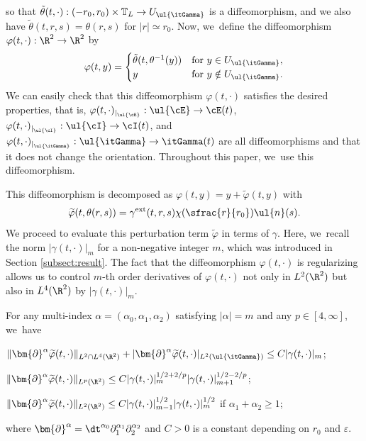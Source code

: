so that $\tilde{\theta}(t,\cdot): (-r_0,r_0)\times\mathbb{T}_L \to U_{\ul{\itGamma}}$ is a diffeomorphism,
and we also have $\tilde{\theta}(t,r,s)=\theta(r,s)$ for $|r|\simeq r_0$.
Now, we~define the diffeomorphism $\varphi(t,\cdot) : \R^2 \to \R^2$ by
\begin{equation}\label{const phi}
\varphi(t,y) =
\begin{cases}
\tilde{\theta}(t,\theta^{-1}(y)) &\text{for } y \in U_{\ul{\itGamma}}, \\
y & \text{for } y \notin U_{\ul{\itGamma}}.
\end{cases}
\end{equation}
We can easily check that this diffeomorphism $\varphi(t,\cdot)$ satisfies the desired properties, that is,
$\varphi(t,\cdot)_{\vert_{\ul{\cE}}} : \ul{\cE}\to \cE(t)$, $\varphi(t,\cdot)_{\vert_{\ul{\cI}}} : \ul{\cI}\to \cI(t)$, and
$\varphi(t,\cdot)_{\vert_{\ul{\itGamma}}} : \ul{\itGamma}\to \itGamma(t)$ are all diffeomorphisms and that it does not change the orientation.
Throughout this paper, we~use this diffeomorphism.

This diffeomorphism is decomposed as $\varphi(t,y)=y+\widetilde{\varphi}(t,y)$ with
\[
\widetilde{\varphi}(t,\theta(r,s))=\gamma^{\rm ext}(t,r,s)\chi(\sfrac{r}{r_0})\ul{n}(s).
\]
We proceed to evaluate this perturbation term $\widetilde{\varphi}$ in terms of $\gamma$.
Here, we~recall the norm $|\gamma(t,\cdot)|_m$ for a non-negative integer $m$, which was introduced in Section \ref{subsect:result}.
The fact that the diffeomorphism $\varphi(t,\cdot)$ is regularizing allows us to control $m$-th order derivatives of $\varphi(t,\cdot)$
not only in $L^2(\R^2)$ but also in $L^4(\R^2)$ by $|\gamma(t,\cdot)|_m$.

\begin{lemma}\label{lem:EstDM}
For any multi-index $\alpha=(\alpha_0,\alpha_1,\alpha_2)$ satisfying $|\alpha|=m$ and any $p\in[4,\infty]$, we~have
\begin{enumeratei}
\item\label{lem:EstDMi}
$\|\bm{\partial}^\alpha\widetilde{\varphi}(t,\cdot)\|_{L^2\cap L^4(\R^2)} + |\bm{\partial}^\alpha\widetilde{\varphi}(t,\cdot)|_{L^2(\ul{\itGamma})}
\leq C|\gamma(t,\cdot)|_m$;
\item\label{lem:EstDMii}
$\|\bm{\partial}^\alpha\widetilde{\varphi}(t,\cdot)\|_{L^p(\R^2)}\leq C|\gamma(t,\cdot)|_m^{1/2+2/p}|\gamma(t,\cdot)|_{m+1}^{1/2-2/p}$;
\item\label{lem:EstDMiii}
$\|\bm{\partial}^\alpha\widetilde{\varphi}(t,\cdot)\|_{L^2(\R^2)}\leq C|\gamma(t,\cdot)|_{m-1}^{1/2}|\gamma(t,\cdot)|_m^{1/2}$ if $\alpha_1+\alpha_2\geq1$;
\end{enumeratei}
where $\bm{\partial}^\alpha=\dt^{\alpha_0}\partial_1^{\alpha_1}\partial_2^{\alpha_2}$ and $C>0$ is a constant depending on $r_0$ and $\varepsilon$.
\end{lemma}

